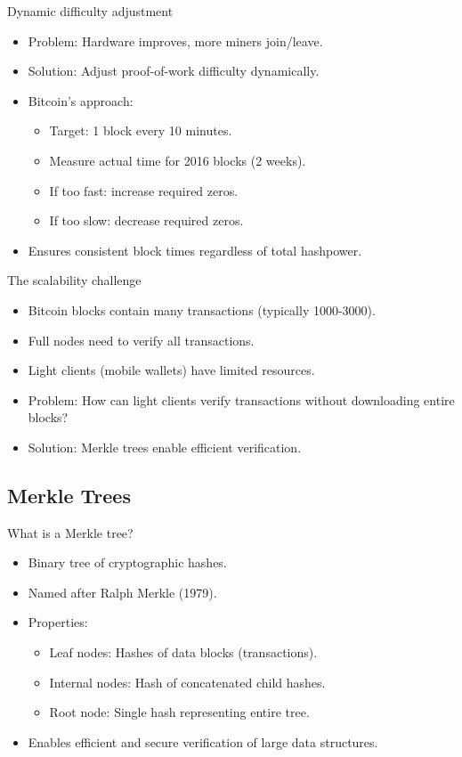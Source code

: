 \documentclass[aspectratio=169, lualatex, handout]{beamer}
\begin{document}
\begin{frame}{Dynamic difficulty adjustment}
	\begin{itemize}
		\item Problem: Hardware improves, more miners join/leave.
		\item Solution: Adjust proof-of-work difficulty dynamically.
		\item Bitcoin's approach:
		      \begin{itemize}
			      \item Target: 1 block every 10 minutes.
			      \item Measure actual time for 2016 blocks (2 weeks).
			      \item If too fast: increase required zeros.
			      \item If too slow: decrease required zeros.
		      \end{itemize}
		\item Ensures consistent block times regardless of total hashpower.
	\end{itemize}
\end{frame}

\begin{frame}{The scalability challenge}
	\begin{itemize}
		\item Bitcoin blocks contain many transactions (typically 1000-3000).
		\item Full nodes need to verify all transactions.
		\item Light clients (mobile wallets) have limited resources.
		\item Problem: How can light clients verify transactions without downloading entire blocks?
		\item Solution: Merkle trees enable efficient verification.
	\end{itemize}
\end{frame}

\subsection{Merkle Trees}

\begin{frame}{What is a Merkle tree?}
	\begin{itemize}
		\item Binary tree of cryptographic hashes.
		\item Named after Ralph Merkle (1979).
		\item Properties:
		      \begin{itemize}
			      \item Leaf nodes: Hashes of data blocks (transactions).
			      \item Internal nodes: Hash of concatenated child hashes.
			      \item Root node: Single hash representing entire tree.
		      \end{itemize}
		\item Enables efficient and secure verification of large data structures.
	\end{itemize}
\end{frame}
\end{document}
